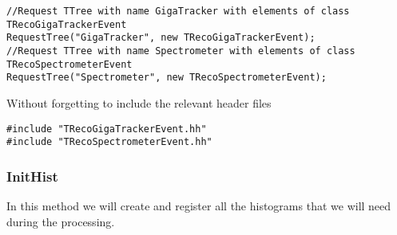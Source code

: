 \documentclass{article}
\begin{document}
\begin{lstlisting}
//Request TTree with name GigaTracker with elements of class TRecoGigaTrackerEvent
RequestTree("GigaTracker", new TRecoGigaTrackerEvent);
//Request TTree with name Spectrometer with elements of class TRecoSpectrometerEvent
RequestTree("Spectrometer", new TRecoSpectrometerEvent);
\end{lstlisting}
 
 Without forgetting to include the relevant header files
\begin{lstlisting}
#include "TRecoGigaTrackerEvent.hh"
#include "TRecoSpectrometerEvent.hh"
\end{lstlisting}

\subsubsection{InitHist}
In this method we will create and register all the histograms that we will need
during the processing.
\end{document}
